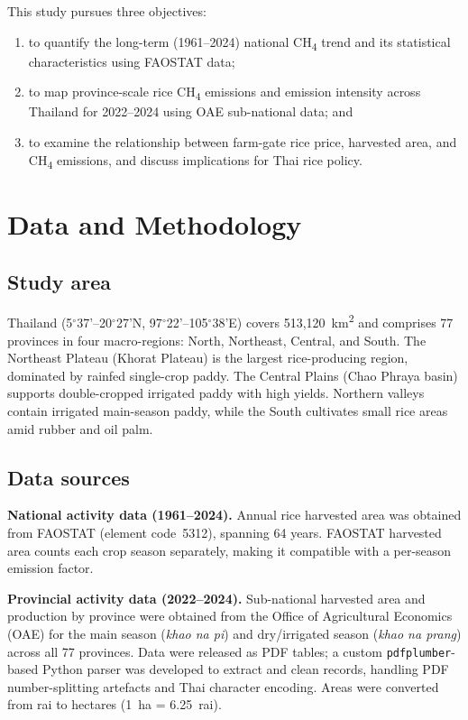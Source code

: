 \documentclass[fleqn,10pt]{olplainarticle}
\begin{document}
This study pursues three objectives:
\begin{enumerate}[noitemsep]
  \item to quantify the long-term (1961--2024) national CH\textsubscript{4} trend
        and its statistical characteristics using FAOSTAT data;
  \item to map province-scale rice CH\textsubscript{4} emissions and emission
        intensity across Thailand for 2022--2024 using OAE sub-national data; and
  \item to examine the relationship between farm-gate rice price, harvested area,
        and CH\textsubscript{4} emissions, and discuss implications for Thai rice policy.
\end{enumerate}

\section*{Data and Methodology}

\subsection*{Study area}

Thailand (5$^\circ$37'--20$^\circ$27'N, 97$^\circ$22'--105$^\circ$38'E) covers 513,120~km\textsuperscript{2}
and comprises 77 provinces in four macro-regions: North, Northeast, Central, and South.
The Northeast Plateau (Khorat Plateau) is the largest rice-producing region,
dominated by rainfed single-crop paddy.
The Central Plains (Chao Phraya basin) supports double-cropped irrigated paddy
with high yields.
Northern valleys contain irrigated main-season paddy, while the South cultivates
small rice areas amid rubber and oil palm.

\subsection*{Data sources}

\textbf{National activity data (1961--2024).}
Annual rice harvested area was obtained from FAOSTAT \citep{faostat2026}
(element code~5312), spanning 64 years.
FAOSTAT harvested area counts each crop season separately, making it compatible
with a per-season emission factor.

\textbf{Provincial activity data (2022--2024).}
Sub-national harvested area and production by province were obtained from the
Office of Agricultural Economics (OAE) \citep{oae2024} for the main season
(\textit{khao na pi}) and dry/irrigated season
(\textit{khao na prang}) across all 77 provinces.
Data were released as PDF tables; a custom \texttt{pdfplumber}-based Python
parser was developed to extract and clean records, handling PDF number-splitting
artefacts and Thai character encoding.
Areas were converted from rai to hectares (1~ha = 6.25~rai).
\end{document}
